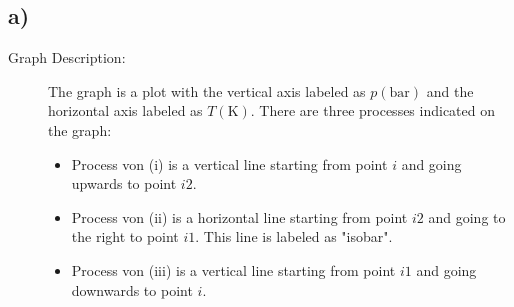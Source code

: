 

\subsection*{a)}

\begin{description}
    \item[Graph Description:] The graph is a plot with the vertical axis labeled as \( p(\text{bar}) \) and the horizontal axis labeled as \( T(\text{K}) \). There are three processes indicated on the graph:
    \begin{itemize}
        \item Process von (i) is a vertical line starting from point \( i \) and going upwards to point \( i2 \).
        \item Process von (ii) is a horizontal line starting from point \( i2 \) and going to the right to point \( i1 \). This line is labeled as "isobar".
        \item Process von (iii) is a vertical line starting from point \( i1 \) and going downwards to point \( i \).
    \end{itemize}
\end{description}